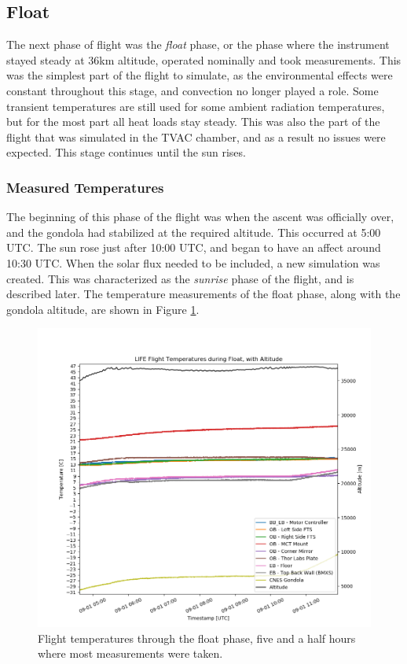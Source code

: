 \subsection{Float}
The next phase of flight was the \textit{float} phase, or the phase where the instrument stayed steady at 36km altitude, operated nominally and took measurements. This was the simplest part of the flight to simulate, as the environmental effects were constant throughout this stage, and convection no longer played a role. Some transient temperatures are still used for some ambient radiation temperatures, but for the most part all heat loads stay steady. This was also the part of the flight that was simulated in the TVAC chamber, and as a result no issues were expected. This stage continues until the sun rises.

\subsubsection{Measured Temperatures}
The beginning of this phase of the flight was when the ascent was officially over, and the gondola had stabilized at the required altitude. This occurred at 5:00 UTC. The sun rose just after 10:00 UTC, and began to have an affect around 10:30 UTC. When the solar flux needed to be included, a new simulation was created. This was characterized as the \textit{sunrise} phase of the flight, and is described later. The temperature measurements of the float phase, along with the gondola altitude, are shown in Figure \ref{fig:float_temps_no_sims}.

\begin{figure}
    \centering
    \includegraphics[width=\textwidth]{chap4_images/float_images/float_no_sim_temps.png}
    \caption{Flight temperatures through the float phase, five and a half hours where most measurements were taken.}
    \label{fig:float_temps_no_sims}
\end{figure}

